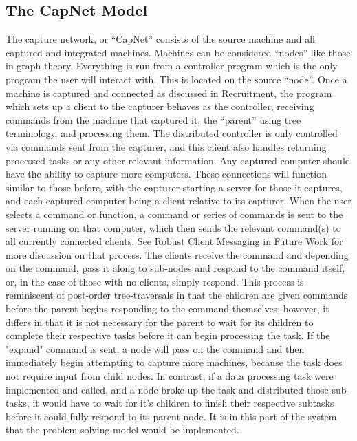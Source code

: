 \subsection{The CapNet Model}
The capture network, or “CapNet” consists of the source machine and all captured and integrated machines. Machines can be considered “nodes” like those in graph theory. Everything is run from a controller program which is the only program the user will interact with. This is located on the source “node”. Once a machine is captured and connected as discussed in Recruitment, the program which sets up a client to the capturer behaves as the controller, receiving commands from the machine that captured it, the “parent” using tree terminology, and processing them. The distributed controller is only controlled via commands sent from the capturer, and this client also handles returning processed tasks or any other relevant information. Any captured computer should have the ability to capture more computers. These connections will function similar to those before, with the capturer starting a server for those it captures, and each captured computer being a client relative to its capturer. When the user selects a command or function, a command or series of commands is sent to the server running on that computer, which then sends the relevant command(s) to all currently connected clients. See Robust Client Messaging in Future Work for more discussion on that process. The clients receive the command and depending on the command, pass it along to sub-nodes and respond to the command itself, or, in the case of those with no clients, simply respond. This process is reminiscent of post-order tree-traversals in that the children are given commands before the parent begins responding to the command themselves; however, it differs in that it is not necessary for the parent to wait for its children to complete their respective tasks before it can begin processing the task. If the "expand" command is sent, a node will pass on the command and then immediately begin attempting to capture more machines, because the task does not require input from child nodes. In contrast, if a data processing task were implemented and called, and a node broke up the task and distributed those sub-tasks, it would have to wait for it's children to finish their respective subtasks before it could fully respond to its parent node. It is in this part of the system that the problem-solving model would be implemented.

